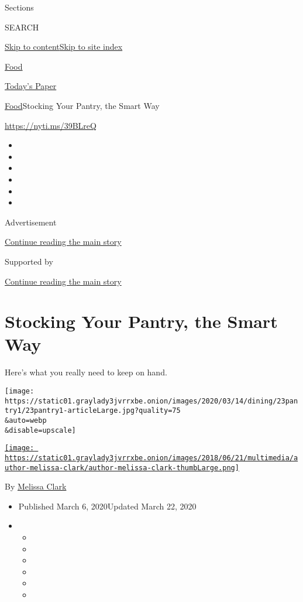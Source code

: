 Sections

SEARCH

\protect\hyperlink{site-content}{Skip to
content}\protect\hyperlink{site-index}{Skip to site index}

\href{https://www.nytimes3xbfgragh.onion/section/food}{Food}

\href{https://myaccount.nytimes3xbfgragh.onion/auth/login?response_type=cookie\&client_id=vi}{}

\href{https://www.nytimes3xbfgragh.onion/section/todayspaper}{Today's
Paper}

\href{/section/food}{Food}\textbar{}Stocking Your Pantry, the Smart Way

\url{https://nyti.ms/39BLreQ}

\begin{itemize}
\item
\item
\item
\item
\item
\item
\end{itemize}

Advertisement

\protect\hyperlink{after-top}{Continue reading the main story}

Supported by

\protect\hyperlink{after-sponsor}{Continue reading the main story}

\hypertarget{stocking-your-pantry-the-smart-way}{%
\section{Stocking Your Pantry, the Smart
Way}\label{stocking-your-pantry-the-smart-way}}

Here's what you really need to keep on hand.

\texttt{[image: https://static01.graylady3jvrrxbe.onion/images/2020/03/14/dining/23pantry1/23pantry1-articleLarge.jpg?quality=75\\\&auto=webp\\\&disable=upscale]}

\href{https://www.nytimes3xbfgragh.onion/by/melissa-clark}{\texttt{[image: https://static01.graylady3jvrrxbe.onion/images/2018/06/21/multimedia/author-melissa-clark/author-melissa-clark-thumbLarge.png]}}

By \href{https://www.nytimes3xbfgragh.onion/by/melissa-clark}{Melissa
Clark}

\begin{itemize}
\item
  Published March 6, 2020Updated March 22, 2020
\item
  \begin{itemize}
  \item
  \item
  \item
  \item
  \item
  \item
  \end{itemize}
\end{itemize}

